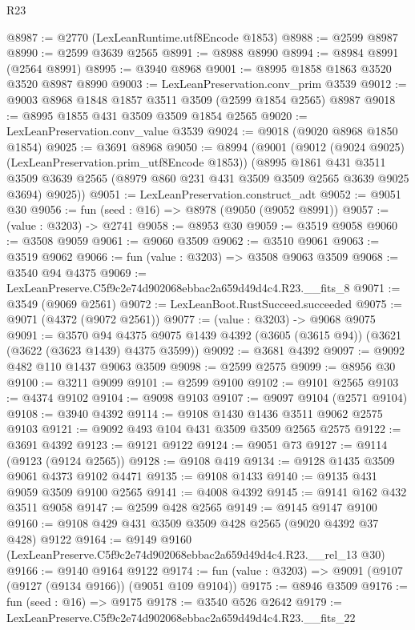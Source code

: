 \begin{lexlean}{R23}
\begin{coremodule}
@8987 := @2770 (LexLeanRuntime.utf8Encode @1853)
@8988 := @2599 @8987
@8990 := @2599 @3639 @2565
@8991 := @8988 @8990
@8994 := @8984 @8991 (@2564 @8991)
@8995 := @3940 @8968
@9001 := @8995 @1858 @1863 @3520 @3520 @8987 @8990
@9003 := LexLeanPreservation.conv_prim @3539
@9012 := @9003 @8968 @1848 @1857 @3511 @3509 (@2599 @1854 @2565) @8987
@9018 := @8995 @1855 @431 @3509 @3509 @1854 @2565
@9020 := LexLeanPreservation.conv_value @3539
@9024 := @9018 (@9020 @8968 @1850 @1854)
@9025 := @3691 @8968
@9050 := @8994
    (@9001
      (@9012 (@9024 @9025) (LexLeanPreservation.prim_utf8Encode @1853))
      (@8995
        @1861
        @431
        @3511
        @3509
        @3639
        @2565
        (@8979 @860 @231 @431 @3509 @3509 @2565 @3639 @9025 @3694)
        @9025))
@9051 := LexLeanPreservation.construct_adt
@9052 := @9051 @30
@9056 := fun (seed : @16) => @8978 (@9050 (@9052 @8991))
@9057 := (value : @3203) -> @2741
@9058 := @8953 @30
@9059 := @3519 @9058
@9060 := @3508 @9059
@9061 := @9060 @3509
@9062 := @3510 @9061
@9063 := @3519 @9062
@9066 := fun (value : @3203) => @3508 @9063 @3509
@9068 := @3540 @94 @4375
@9069 := LexLeanPreserve.C5f9c2e74d902068ebbac2a659d49d4c4.R23.__fits_8
@9071 := @3549 (@9069 @2561)
@9072 := LexLeanBoot.RustSucceed.succeeded
@9075 := @9071 (@4372 (@9072 @2561))
@9077 := (value : @3203) -> @9068 @9075
@9091 := @3570
    @94
    @4375
    @9075
    @1439
    @4392
    (@3605 (@3615 @94))
    (@3621 (@3622 (@3623 @1439) @4375 @3599))
@9092 := @3681 @4392
@9097 := @9092 @482 @110 @1437 @9063 @3509
@9098 := @2599 @2575
@9099 := @8956 @30
@9100 := @3211 @9099
@9101 := @2599 @9100
@9102 := @9101 @2565
@9103 := @4374 @9102
@9104 := @9098 @9103
@9107 := @9097 @9104 (@2571 @9104)
@9108 := @3940 @4392
@9114 := @9108 @1430 @1436 @3511 @9062 @2575 @9103
@9121 := @9092 @493 @104 @431 @3509 @3509 @2565 @2575
@9122 := @3691 @4392
@9123 := @9121 @9122
@9124 := @9051 @73
@9127 := @9114 (@9123 (@9124 @2565))
@9128 := @9108 @419
@9134 := @9128 @1435 @3509 @9061 @4373 @9102 @4471
@9135 := @9108 @1433
@9140 := @9135 @431 @9059 @3509 @9100 @2565
@9141 := @4008 @4392
@9145 := @9141 @162 @432 @3511 @9058
@9147 := @2599 @428 @2565
@9149 := @9145 @9147 @9100
@9160 := @9108 @429 @431 @3509 @3509 @428 @2565 (@9020 @4392 @37 @428) @9122
@9164 := @9149 @9160 (LexLeanPreserve.C5f9c2e74d902068ebbac2a659d49d4c4.R23.__rel_13 @30)
@9166 := @9140 @9164 @9122
@9174 := fun (value : @3203) => @9091 (@9107 (@9127 (@9134 @9166)) (@9051 @109 @9104))
@9175 := @8946 @3509
@9176 := fun (seed : @16) => @9175
@9178 := @3540 @526 @2642
@9179 := LexLeanPreserve.C5f9c2e74d902068ebbac2a659d49d4c4.R23.__fits_22

\end{coremodule}
\end{lexlean}
